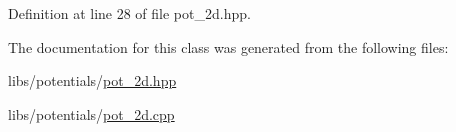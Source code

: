 Definition at line 28 of file pot\-\_\-2d.\-hpp.



The documentation for this class was generated from the following files\-:\begin{DoxyCompactItemize}
\item 
libs/potentials/\hyperlink{pot__2d_8hpp}{pot\-\_\-2d.\-hpp}\item 
libs/potentials/\hyperlink{pot__2d_8cpp}{pot\-\_\-2d.\-cpp}\end{DoxyCompactItemize}
